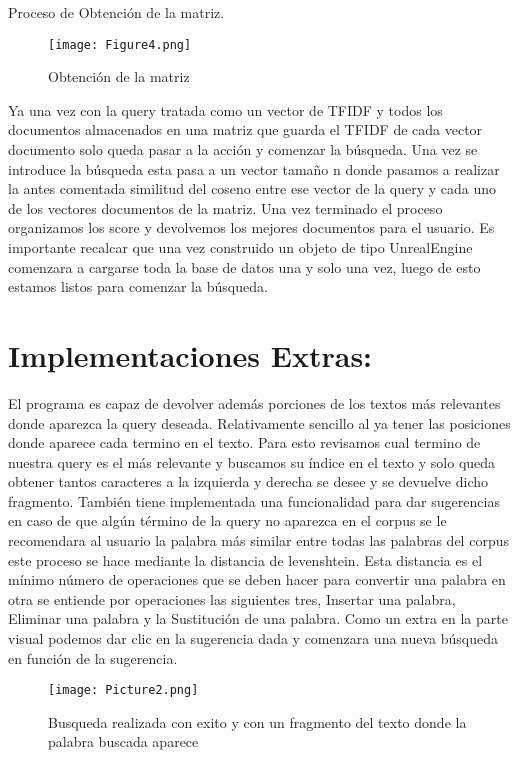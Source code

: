 \documentclass[a4paper,12pt]{article}
\begin{document}
Proceso de Obtención de la matriz.

\begin{figure}[h]
    \center
    \texttt{[image: Figure4.png]}
    \caption{Obtención de la matriz}
    \label{fig:logo}
\end{figure}

Ya una vez con la query tratada como un vector de TFIDF y todos los documentos almacenados en una matriz que guarda el TFIDF de cada vector documento solo queda pasar a la acción y comenzar la búsqueda. Una vez se introduce la búsqueda esta pasa a un vector tamaño n donde pasamos a realizar la antes comentada similitud del coseno entre ese vector de la query y cada uno de los vectores documentos de la matriz. Una vez terminado el proceso organizamos los score y devolvemos los mejores documentos para el usuario.
Es importante recalcar que una vez construido un objeto de tipo UnrealEngine comenzara a cargarse toda la base de datos una y solo una vez, luego de esto estamos listos para comenzar la búsqueda.

\section{Implementaciones Extras:}\label{sec:Extras}

El programa es capaz de devolver además porciones de los textos más relevantes donde aparezca la query deseada. Relativamente sencillo al ya tener las posiciones donde aparece cada termino en el texto. Para esto revisamos cual termino de nuestra query es el más relevante y buscamos su índice en el texto y solo queda obtener tantos  caracteres a la izquierda y derecha se desee y se devuelve dicho fragmento.
También tiene implementada una funcionalidad para dar sugerencias en caso de que algún término de la query no aparezca en el corpus se le recomendara al usuario la palabra más similar entre todas las palabras del corpus este proceso se hace mediante la distancia de levenshtein. Esta distancia es el mínimo número de operaciones que se deben hacer para convertir una palabra en otra se entiende por operaciones las siguientes tres, Insertar una palabra, Eliminar una palabra y la Sustitución de una palabra.
Como un extra en la parte visual podemos dar clic en la sugerencia dada y comenzara una nueva búsqueda en función de la sugerencia.


\begin{figure}[h]
    \center
    \texttt{[image: Picture2.png]}
    \caption{Busqueda realizada con exito y con un fragmento del texto donde la palabra buscada aparece}
    \label{fig:logo}
\end{figure}
\end{document}

